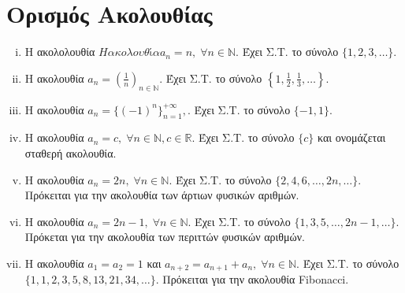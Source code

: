 \documentclass[main.tex]{subfiles}
\begin{document}
\section{Ορισμός Ακολουθίας}



\begin{examples}
\item {}
  \begin{enumerate}[i)]
    \item Η ακολολουθία $ Η ακολουθία a_{n} = n, \; \forall n \in \mathbb{N} $. 
      Έχει Σ.Τ.  το σύνολο $  \{ 1,2,3, \ldots \} $.
    \item Η ακολουθία $ a_{n}=\left(\frac{1}{n}\right)_{n \in \mathbb{N}} $. 
      Έχει Σ.Τ. το σύνολο $  \left\{ 1, \frac{1}{2}, \frac{1}{3}, \ldots \right\} $.
    \item Η ακολουθία $ a_{n}= \{(-1)^{n}\}_{n=1}^{+ \infty}, $. Έχει Σ.Τ. 
      το σύνολο $ \{ -1,1 \} $.
    \item Η ακολουθία $ a_{n} = c, \; \forall n \in \mathbb{N}, c \in \mathbb{R} $.
      Έχει Σ.Τ. το σύνολο $ \{ c \} $ και ονομάζεται 
      \textcolor{Col\thechapter}{σταθερή ακολουθία}.
    \item Η ακολουθία $ a_{n}=2n, \; \forall n \in \mathbb{N} $. Έχει Σ.Τ. το 
      σύνολο $ \{ 2,4,6, \ldots, 2n, \ldots \} $. Πρόκειται για την 
      \textcolor{Col\thechapter}{ακολουθία των άρτιων} φυσικών αριθμών.
    \item Η ακολουθία $ a_{n}= 2n-1, \; \forall n \in \mathbb{N} $. Έχει Σ.Τ. το 
      σύνολο $ \{ 1,3,5, \ldots, 2n-1, \ldots \} $. Πρόκεται για την 
      \textcolor{Col\thechapter}{ακολουθία των περιττών} φυσικών αριθμών.
    \item \label{ex:anadr} Η ακολουθία $ a_{1}= a_{2} = 1 $ και $ a_{n+2}=a_{n+1}
      +a_{n}, \; \forall n \in \mathbb{N}$. Έχει Σ.Τ. το σύνολο 
      $ \{ 1,1,2,3,5,8, 13,21,34, \ldots\} $.  Πρόκειται για την 
      \textcolor{Col\thechapter}{ακολουθία Fibonacci}. 
  \end{enumerate}
\end{examples}
\end{document}
